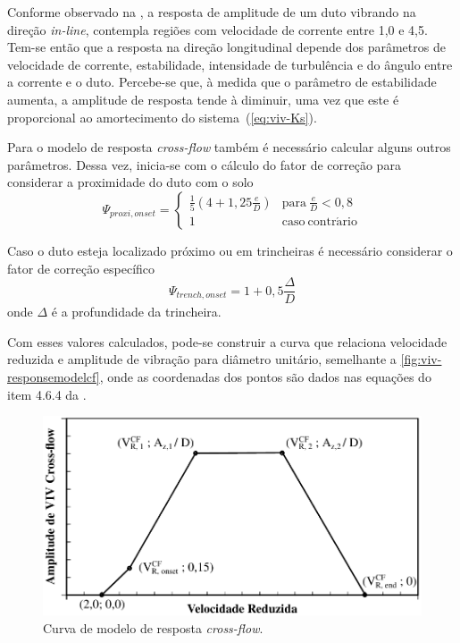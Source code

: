 Conforme observado na , a resposta de amplitude de um duto vibrando na direção \textit{in-line}, contempla regiões com velocidade de corrente entre 1,0 e 4,5.
Tem-se então que a resposta na direção longitudinal depende dos parâmetros de velocidade de corrente, estabilidade, intensidade de turbulência e do ângulo entre a corrente e o duto.
Percebe-se que, à medida que o parâmetro de estabilidade aumenta, a amplitude de resposta tende à diminuir, uma vez que este é proporcional ao amortecimento do sistema~(\autoref{eq:viv-Ks}).

Para o modelo de resposta \textit{cross-flow} também  é necessário calcular alguns outros parâmetros. Dessa vez, inicia-se com o cálculo do fator de correção para considerar a proximidade do duto com o solo
\begin{equation}
\label{eq:viv-Psi}
\Psi_{\mathit{proxi}, \mathit{onset}} =
\begin{cases}
\frac{1}{5}\left(4 + 1,25\frac{e}{D} \right) & \mathrm{para}~\frac{e}{D} < 0,8\\
1                                            & \mathrm{caso~contr\acute{a}rio}
\end{cases}
\end{equation}

Caso o duto esteja localizado próximo ou em trincheiras é necessário considerar o fator de correção específico
\begin{equation}
\label{eq:viv-Psitren}
\Psi_{\mathit{trench}, \mathit{onset}} = 1 + 0,5\frac{\Delta}{D}
\end{equation}
onde $\Delta$ é a profundidade da trincheira.

Com esses valores calculados, pode-se construir a curva que relaciona velocidade reduzida e amplitude de vibração para diâmetro unitário, semelhante a \autoref{fig:viv-responsemodelcf}, onde as coordenadas dos pontos são dados nas equações do item 4.6.4 da .

\begin{figure}[!ht]
    \centering
    \caption{Curva de modelo de resposta \textit{cross-flow}.}\label{fig:viv-responsemodelcf}
    \includegraphics[width=0.65\linewidth]{imagens/response_model_CF}
\end{figure}



